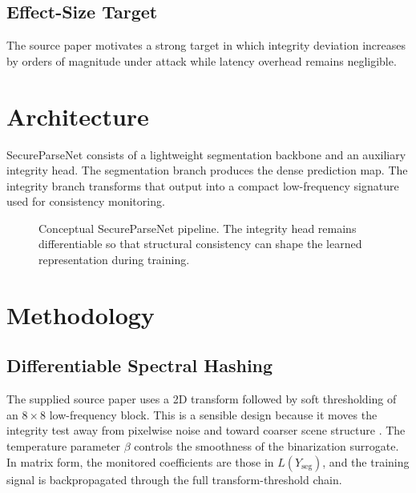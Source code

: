 \documentclass[11pt]{article}
\begin{document}
\subsection*{Effect-Size Target}
The source paper motivates a strong target in which integrity deviation increases by orders of magnitude under attack while latency overhead remains negligible.

\section{Architecture}
SecureParseNet consists of a lightweight segmentation backbone and an auxiliary integrity head. The segmentation branch produces the dense prediction map. The integrity branch transforms that output into a compact low-frequency signature used for consistency monitoring.

\begin{figure}[t]
\centering
{}
\caption{Conceptual SecureParseNet pipeline. The integrity head remains differentiable so that structural consistency can shape the learned representation during training.}
\label{fig:spn-pipeline}
\end{figure}

\section{Methodology}
\subsection{Differentiable Spectral Hashing}
The supplied source paper uses a 2D transform followed by soft thresholding of an $8\times 8$ low-frequency block. This is a sensible design because it moves the integrity test away from pixelwise noise and toward coarser scene structure \citep{zauner2010implementation}. The temperature parameter $\beta$ controls the smoothness of the binarization surrogate. In matrix form, the monitored coefficients are those in $L(Y_{\mathrm{seg}})$, and the training signal is backpropagated through the full transform-threshold chain.
\end{document}
